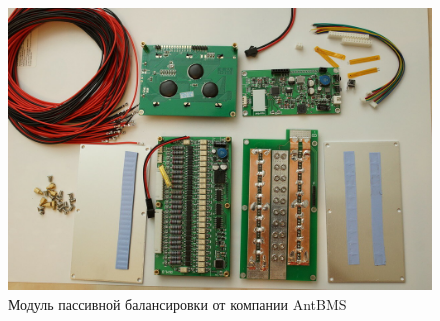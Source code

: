 \begin{figure}[!h]
    \centering
    \includegraphics[width=0.9\linewidth]{img/ant_bms.jpg}
    \caption{Модуль пассивной балансировки от компании AntBMS}
    \label{fig:antbms}
\end{figure}